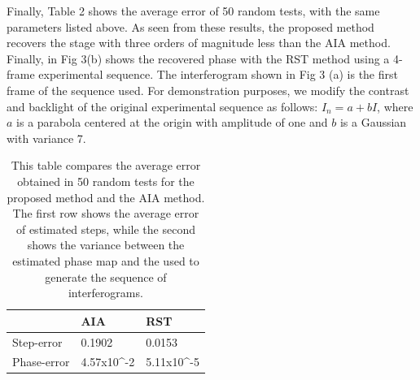 \documentclass[letterpaper,12pt]{article}   %
\begin{document}
Finally, Table 2 shows the average error of 50 random tests, with the same parameters 
listed above. As seen from these results, the proposed method recovers the stage with 
three orders of magnitude less than the AIA method.
Finally, in Fig 3(b) shows the recovered phase with the RST method using a 4-frame
experimental sequence. The interferogram shown in Fig 3 (a) is the first frame of the sequence used. For demonstration purposes, we modify the contrast and backlight of the original experimental sequence as follows: $I_n=a+bI$, where $a$ is a parabola centered at the origin with amplitude of one and $b$ is a Gaussian with variance 7.
\begin{table}
	\begin{center}
		\begin{tabular}{|l|l|l|}
		\hline
		            & AIA    & RST 	    \\ \hline \hline
		Step-error  & 0.1902 & 0.0153	\\ \hline
		Phase-error & 4.57x10^{-2} & 5.11x10^{-5} \\ \hline
		
		\end{tabular}
	\end{center}
	\caption{This table compares the average error obtained in 50 random tests for the
	proposed method and the AIA method. The first row shows the average error of
	estimated steps, while the second shows the variance between the estimated phase map
	and the used to generate the sequence of interferograms.} 
	\label{Tab:mean-phase_error}
\end{table}
\end{document}
